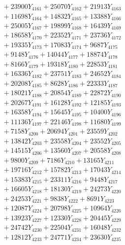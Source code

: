 \documentclass[a4paper,10pt]{article}
\begin{document}
{\begin{align}
&\;  + 23900 Y_{4161} + 25070 Y_{4162} + 21913 Y_{4163} \\[0.3ex]
&\;  + 11698 Y_{4164} + 14832 Y_{4165} + 13388 Y_{4166} \\[0.3ex]
&\;  + 25005 Y_{4167} + 19899 Y_{4168} + 16439 Y_{4169} \\[0.5ex]\allowbreak
&\;  + 18658 Y_{4170} + 22352 Y_{4171} + 23736 Y_{4172} \\[0.3ex]
&\;  + 19335 Y_{4173} + 17083 Y_{4174} + 9687 Y_{4175} \\[0.3ex]
&\;  + 9148 Y_{4176} + 14044 Y_{4177} + 18874 Y_{4178} \\[0.3ex]
&\;  + 8166 Y_{4179} + 19318 Y_{4180} + 22853 Y_{4181} \\[0.3ex]
&\;  + 16336 Y_{4182} + 23751 Y_{4183} + 24652 Y_{4184} \\[0.3ex]
&\;  + 20208 Y_{4185} + 8628 Y_{4186} + 22333 Y_{4187} \\[0.3ex]
&\;  + 18021 Y_{4188} + 20854 Y_{4189} + 22872 Y_{4190} \\[0.3ex]
&\;  + 20267 Y_{4191} + 16128 Y_{4192} + 12185 Y_{4193} \\[0.3ex]
&\;  + 16358 Y_{4194} + 15645 Y_{4195} + 10400 Y_{4196} \\[0.3ex]
&\;  + 11136 Y_{4197} + 22146 Y_{4198} + 11680 Y_{4199} \\[0.5ex]\allowbreak
&\;  + 7158 Y_{4200} + 20694 Y_{4201} + 23559 Y_{4202} \\[0.3ex]
&\;  + 13842 Y_{4203} + 23558 Y_{4204} + 23552 Y_{4205} \\[0.3ex]
&\;  + 14515 Y_{4206} + 13560 Y_{4207} + 20558 Y_{4208} \\[0.3ex]
&\;  + 9800 Y_{4209} + 7186 Y_{4210} + 13165 Y_{4211} \\[0.3ex]
&\;  + 19716 Y_{4212} + 15782 Y_{4213} + 17043 Y_{4214} \\[0.3ex]
&\;  + 15383 Y_{4215} + 23311 Y_{4216} + 9448 Y_{4217} \\[0.3ex]
&\;  + 16605 Y_{4218} + 18130 Y_{4219} + 24273 Y_{4220} \\[0.3ex]
&\;  + 24253 Y_{4221} + 9838 Y_{4222} + 8691 Y_{4223} \\[0.3ex]
&\;  + 12087 Y_{4224} + 20798 Y_{4225} + 10964 Y_{4226} \\[0.3ex]
&\;  + 13923 Y_{4227} + 12330 Y_{4228} + 20445 Y_{4229} \\[0.5ex]\allowbreak
&\;  + 24742 Y_{4230} + 22504 Y_{4231} + 16048 Y_{4232} \\[0.3ex]
&\;  + 12812 Y_{4233} + 24771 Y_{4234} + 23630 Y_{4235} \\[0.3ex]

\end{align}}
\end{document}
